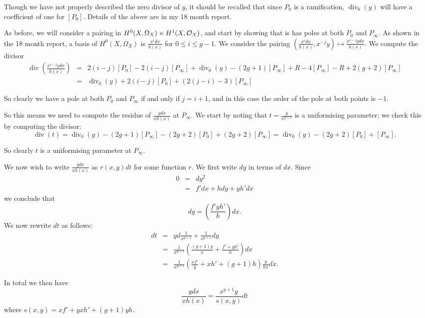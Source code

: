 \documentclass[draft, 11pt]{article} %
\theoremstyle{plain}
\theoremstyle{remark}
\newcommand{\cO}{{\cal O}}
\DeclareMathOperator{\di}{div}
\begin{document}
Though we have not properly described the zero divisor of $y$, it should be recalled that since $P_0$ is a ramification, $\di_0(y)$ will have a coefficient of one for $[P_0]$.
Details of the above are in my 18 month report.

As before, we will consider a pairing in $H^0(X,\Omega_X) \times H^1(X,\cO_X)$, and start by showing that is has poles at both $P_0$ and $P_\infty$.
As shown in the 18 month report, a basis of $H^0(X,\Omega_X)$ is $\frac{x^idx}{h(x)}$ for $0 \leq i \leq g-1$.
We consider the pairing $\left(\frac{x^idx}{h(x)}, x^{-j}y\right) \mapsto \frac{x^{i-j}ydx}{h(x)}$.
We compute the divisor
\begin{eqnarray*}
\di\left(\frac{x^{i-j}ydx}{h(x)}\right)  & = & 2(i-j)[P_0] - 2(i-j)[P_\infty] + \di_0(y) - (2g+1)[P_\infty] +R -4[P_\infty] -R +2(g+2)[P_\infty] \\
& = &  \di_0(y) + 2(i-j)[P_0] +(2(j-i)-3)[P_\infty]
\end{eqnarray*}

So clearly we have a pole at both $P_0$ and $P_\infty$ if and only if $j=i+1$, and in this case the order of the pole at both points is $-1$.

So this means we need to compute the residue of $\frac{ydx}{xh(x)}$ at $P_\infty$.
We start by noting that $t = \frac{y}{x^{g+1}}$ is a uniformising parameter; we check this by computing the divisor:
\[
\di(t) = \di_0(y) - (2g+1)[P_\infty] -(2g+2)[P_0] + (2g+2)[P_\infty] = \di_0(y)-(2g+2)[P_0] + [P_\infty].
\]

So clearly $t$ is a uniformising parameter at $P_\infty$.

We now wish to write $\frac{ydx}{xh(x)}$ as $r(x,y)dt$ for some function $r$.
We first write $dy$ in terms of $dx$.
Since
\begin{eqnarray}
0 & = & dy^2 \\
& = & f'dx + hdy + yh'dx
\end{eqnarray}
we conclude that 
\[
dy = \left( \frac{f'yh'}{h} \right) dx.
\]
We now rewrite $dt$ as follows:
\begin{eqnarray}
dt & = & yd\frac{1}{x^{g+1}} + \frac{1}{x^{g+1}}dy \\
& = & \frac{1}{x^{g+1}} \left( \frac{(g+1)y}{x} + \frac{f'+yh'}{h} \right) dx \\
& = & \frac{1}{x^{g+1}} \left( \frac{xf'}{y} + xh' + (g+1)h \right) \frac{y}{hx} dx.
\end{eqnarray}

In total we then have
\[
\frac{ydx}{xh(x)} = \frac{x^{g+1}y}{s(x,y)}dt
\]
where $s(x,y) = xf' + yxh' + (g+1)yh$.
\end{document}
